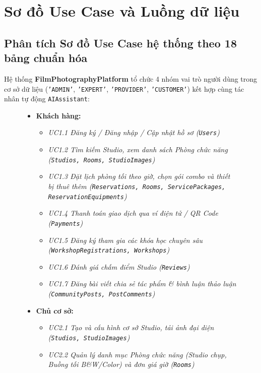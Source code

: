 \section{Sơ đồ Use Case và Luồng dữ liệu}

\subsection{Phân tích Sơ đồ Use Case hệ thống theo 18 bảng chuẩn hóa}
Hệ thống \textbf{FilmPhotographyPlatform} tổ chức 4 nhóm vai trò người dùng trong cơ sở dữ liệu (\texttt{'ADMIN'}, \texttt{'EXPERT'}, \texttt{'PROVIDER'}, \texttt{'CUSTOMER'}) kết hợp cùng tác nhân tự động \texttt{AIAssistant}:

\begin{figure}[H]
\centering
\begin{tcolorbox}[colback=blue!5!white,colframe=blue!75!black,title=\textbf{BẢNG TỔNG HỢP CÁC USE CASE TƯƠNG ỨNG VỚI 18 BẢNG TRONG CƠ SỞ DỮ LIỆU}]
\begin{itemize}[leftmargin=1.5em]
    \item \textbf{Khách hàng:}
    \begin{itemize}
        \item \textit{UC1.1 Đăng ký / Đăng nhập / Cập nhật hồ sơ (\texttt{Users})}
        \item \textit{UC1.2 Tìm kiếm Studio, xem danh sách Phòng chức năng (\texttt{Studios, Rooms, StudioImages})}
        \item \textit{UC1.3 Đặt lịch phòng tối theo giờ, chọn gói combo và thiết bị thuê thêm (\texttt{Reservations, Rooms, ServicePackages, ReservationEquipments})}
        \item \textit{UC1.4 Thanh toán giao dịch qua ví điện tử / QR Code (\texttt{Payments})}
        \item \textit{UC1.5 Đăng ký tham gia các khóa học chuyên sâu (\texttt{WorkshopRegistrations, Workshops})}
        \item \textit{UC1.6 Đánh giá chấm điểm Studio (\texttt{Reviews})}
        \item \textit{UC1.7 Đăng bài viết chia sẻ tác phẩm \& bình luận thảo luận (\texttt{CommunityPosts, PostComments})}
    \end{itemize}
    \item \textbf{Chủ cơ sở:}
    \begin{itemize}
        \item \textit{UC2.1 Tạo và cấu hình cơ sở Studio, tải ảnh đại diện (\texttt{Studios, StudioImages})}
        \item \textit{UC2.2 Quản lý danh mục Phòng chức năng (Studio chụp, Buồng tối B\&W/Color) và đơn giá giờ (\texttt{Rooms})}

\end{itemize}
\end{itemize}
\end{tcolorbox}
\end{figure}
